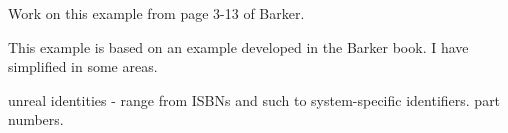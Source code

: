 \mynote Work on this example from page 3-13 of Barker.

{This example is based on an example developed in the Barker book. I have simplified in some areas.}




\begin{noteforfuture}
unreal identities - range from ISBNs and such to system-specific identifiers. part numbers.
\end{noteforfuture}



 
